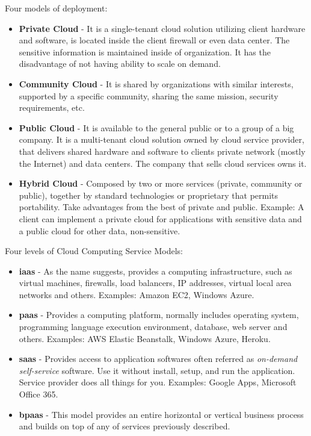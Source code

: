 Four models of deployment:
\begin{itemize}
	\item \textbf{Private Cloud}   - It is a single-tenant cloud solution utilizing client hardware and software, is located inside the client firewall or even data center. The sensitive information is maintained inside of organization. It has the disadvantage of not having ability to scale on demand.
	\item \textbf{Community Cloud} - It is shared by organizations with similar interests, supported by a specific community, sharing the same mission, security requirements, etc.
	\item \textbf{Public Cloud}    - It is available to the general public or to a group of a big company. It is a multi-tenant cloud solution owned by cloud service provider, that delivers shared hardware and software to clients private network (mostly the Internet) and data centers. The company that sells cloud services owns it.

	\item \textbf{Hybrid Cloud}    - Composed by two or more services (private, community or public), together by standard technologies or proprietary that permits portability. Take advantages from the best of private and public. Example: A client can implement a private cloud for applications with sensitive data and a public cloud for other data, non-sensitive.
\end{itemize}

Four levels of Cloud Computing Service Models:

\begin{itemize}
	\item \textbf{\acl{iaas}} - As the name suggests, provides a computing infrastructure, such as virtual machines, firewalls, load balancers, IP addresses, virtual local area networks and others. Examples: Amazon EC2, Windows Azure.

	\item \textbf{\acl{paas}} - Provides a computing platform, normally includes operating system, programming language execution environment, database, web server and others. Examples: AWS Elastic Beanstalk, Windows Azure, Heroku.

	\item \textbf{\acl{saas}} - Provides access to application softwares often referred as \textit{on-demand self-service} software. Use it without install, setup, and run the application. Service provider does all things for you. Examples: Google Apps, Microsoft Office 365.

	\item \textbf{\acl{bpaas}} - This model provides an entire horizontal or vertical business process and builds on top of any of services previously described.

\end{itemize}

